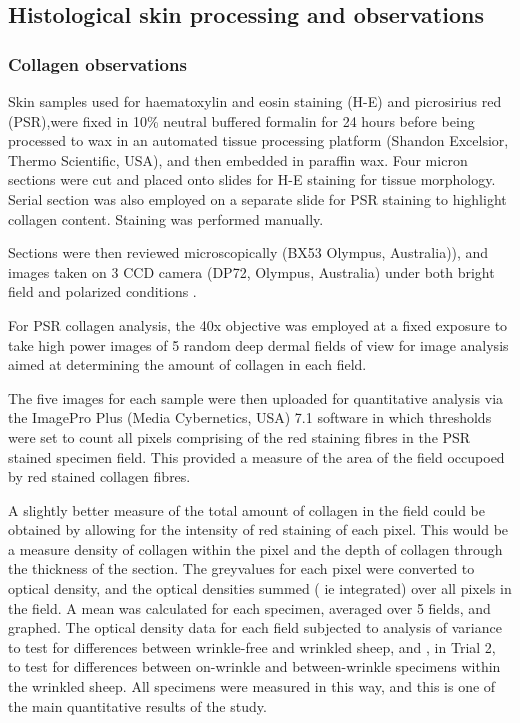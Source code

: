 \documentclass[titlepage]{article}  %
\begin{document}
\subsection{Histological skin processing and observations}
\subsubsection{Collagen observations}

Skin samples used for haematoxylin and eosin staining (H-E) and
picrosirius red (PSR),were fixed in 10\% neutral buffered formalin for
24 hours before being processed to wax in an automated tissue
processing platform (Shandon Excelsior, Thermo Scientific, USA), and
then embedded in paraffin wax. Four micron sections were cut and placed
onto slides for H-E staining for tissue morphology. Serial section was
also employed on a separate slide for PSR staining to highlight
collagen content. Staining was performed manually.

Sections were then reviewed microscopically (BX53 Olympus, Australia)),
and images taken on 3 CCD camera (DP72, Olympus, Australia) under both
bright field and polarized conditions .

For PSR collagen analysis, the 40x objective was employed at a fixed
exposure to take high power images of 5 random deep dermal fields of
view for image analysis aimed at determining the amount of collagen in each field. 

The five images for each sample were then uploaded for quantitative analysis
via the ImagePro Plus (Media Cybernetics, USA) 7.1 software in which
thresholds were set to count all pixels comprising of the red staining
fibres in the PSR stained specimen field.  This provided a measure of the area of the field occupoed by red stained collagen fibres.

A slightly better measure of the total amount of collagen in the field could be obtained by allowing for the intensity of red staining of each pixel. This would be a measure density of collagen within the pixel and the depth of collagen through the thickness of the section.  The greyvalues for each pixel were converted to optical density, and the optical densities summed ( ie integrated) over all pixels in the field.
A mean was calculated for each specimen, averaged over 5 fields, and graphed.
The optical density data for each field subjected to analysis of variance to test for differences between wrinkle-free and wrinkled sheep, and , in Trial 2, to test for differences between on-wrinkle and between-wrinkle specimens within the wrinkled sheep.
All specimens were measured in this way, and this is one of the main quantitative results of the study.
\end{document}
